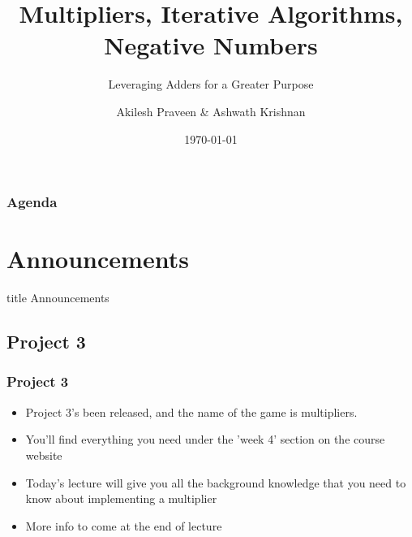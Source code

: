 \documentclass{beamer}
\title{Multipliers, Iterative Algorithms, Negative Numbers}
\subtitle{Leveraging Adders for a Greater Purpose}
\author[A Praveen \& A Krishnan]{Akilesh Praveen \& Ashwath Krishnan}
\institute{UMD}
\date{\today}
\begin{document}
    \begin{frame}
        \titlepage
    \end{frame}
    
    \begin{frame}
        \frametitle{Agenda}
        \tableofcontents
    \end{frame}
    
    \section{Announcements}
    
        \begin{frame}
                \vfill
                \centering
                \begin{beamercolorbox}[sep=8pt,center,shadow=true,rounded=true]{title}
                    Announcements\par%
                \end{beamercolorbox}
                \vfill
             \end{frame}
    
        \subsection{Project 3}
        
            
            
            \begin{frame}
                \frametitle{Project 3}
                \begin{itemize}
                    \item Project 3's been released, and the name of the game is multipliers.
                    \item You'll find everything you need under the 'week 4' section on the course website
                    \item Today's lecture will give you all the background knowledge that you need to know about implementing a multiplier
                    
                    \item More info to come at the end of lecture
                    
                \end{itemize}
            \end{frame}
            
\end{document}
